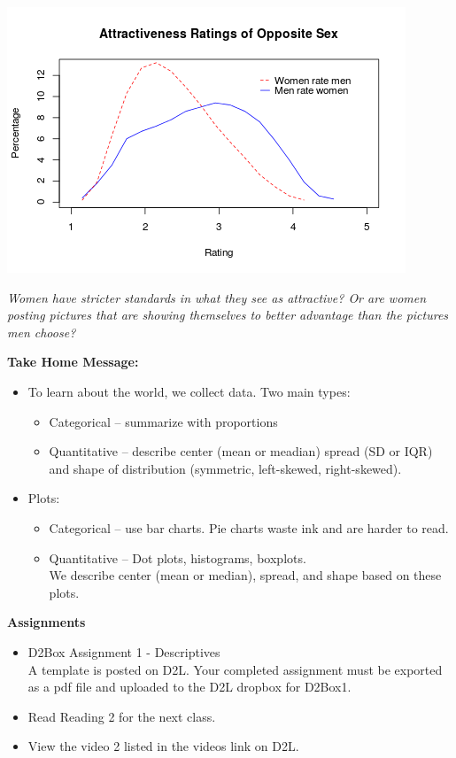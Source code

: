 \begin{enumerate}
 \includegraphics[width=.5\linewidth]{../plots/RateMenAndWomen.png}
\begin{students}
\vfill
\end{students}

\begin{key}
  {\it  Women have stricter standards in what they see as attractive?
     Or are women posting pictures that are showing themselves to
     better advantage than the pictures men choose?}
\end{key}
\end{enumerate}
  



\begin{center}
  {\bf Take Home Message:}
\end{center}
\begin{itemize}
\item To learn about the world, we collect data. Two main types:
  \begin{itemize}
  \item Categorical -- summarize with proportions
  \item Quantitative -- describe center (mean or meadian) spread (SD
    or IQR) and shape of distribution (symmetric, left-skewed,
    right-skewed). 
  \end{itemize}
\item Plots:
  \begin{itemize}
  \item Categorical -- use bar charts. Pie charts waste ink and are
    harder to read.
  \item Quantitative -- Dot plots, histograms, boxplots.\\
    We describe center (mean or median), spread, and shape based on
    these plots.
  \end{itemize}
\end{itemize} \vfill



{\bf Assignments}
\begin{itemize}
\item D2Box Assignment 1 - Descriptives\\
  A template is posted on D2L.
  Your completed assignment must be exported as a pdf file and uploaded
  to the D2L dropbox for D2Box1.
\item Read Reading 2 for the next class.
\item View the video 2 listed in the videos link on D2L.
\end{itemize}


